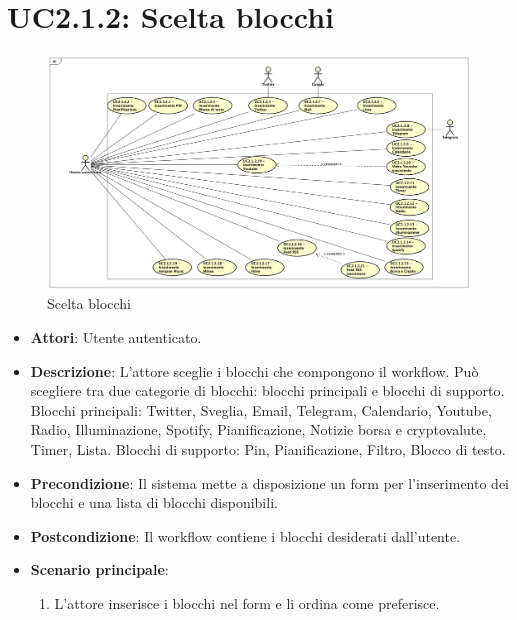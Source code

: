 \section{UC2.1.2: Scelta blocchi}
\label{UC2.1.2}
\begin{figure}[h]
\centering
\includegraphics[scale=0.2]{Diagram/UC2-1-2.png}
\caption{Scelta blocchi}\label{}
\end{figure}
\begin{itemize}
	\item \textbf{Attori}: Utente autenticato.
	\item \textbf{Descrizione}: L'attore sceglie i blocchi che compongono il workflow. Può scegliere tra due categorie di blocchi: blocchi principali e blocchi di supporto.
	Blocchi principali: Twitter, Sveglia, Email, Telegram, Calendario, Youtube, Radio, Illuminazione, Spotify, Pianificazione, Notizie borsa e cryptovalute, Timer, Lista.
	Blocchi di supporto: Pin, Pianificazione, Filtro, Blocco di testo.
	\item \textbf{Precondizione}: Il sistema mette a disposizione un form per l'inserimento dei blocchi e una lista di blocchi disponibili.
	\item \textbf{Postcondizione}: Il workflow contiene i blocchi desiderati dall'utente.
	\item \textbf{Scenario principale}:
	\begin{enumerate} \item L'attore inserisce i blocchi nel form e li ordina come preferisce.\end{enumerate}
\end{itemize}

